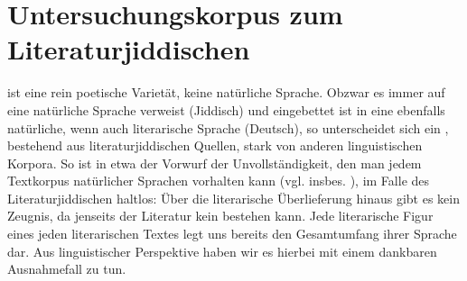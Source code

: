   \chapter{Untersuchungskorpus zum Literaturjiddischen} \label{korpora}
\noindent {} ist eine rein poetische  Varietät, keine natürliche Sprache. Obzwar es immer auf eine natürliche Sprache verweist (Jiddisch) und eingebettet ist in eine ebenfalls natürliche, wenn auch literarische Sprache (Deutsch), so unterscheidet sich ein , bestehend aus literaturjiddischen Quellen, stark von anderen linguistischen Korpora. So ist in etwa der Vorwurf der Unvollständigkeit, den man jedem Textkorpus natürlicher Sprachen  vorhalten kann (vgl. insbes. \cite[159]{Chomsky1957}), im Falle des Literaturjiddischen haltlos: Über die literarische Überlieferung hinaus gibt es kein Zeugnis, da jenseits der Literatur kein  bestehen kann. Jede literarische Figur eines jeden literarischen Textes legt uns bereits den Gesamtumfang ihrer Sprache dar. Aus linguistischer Perspektive haben wir es hierbei mit einem dankbaren Ausnahmefall zu tun. 

